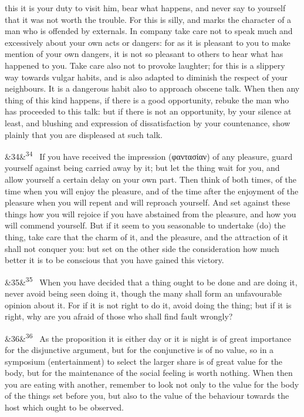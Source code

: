 \documentclass[12pt]{article}
\newcommand{\para}[1][]{\par\noindent\ifx&#1&\else\textsuperscript{\footnotesize #1}~\fi}
\begin{document}
this it is your duty to visit him, bear what happens, and never say to yourself that it was not worth the trouble. For this is silly, and marks the character of a man who is offended by externals. In company take care not to speak much and excessively about your own acts or dangers: for as it is pleasant to you to make mention of your own dangers, it is not so pleasant to others to hear what has happened to you. Take care also not to provoke laughter; for this is a slippery way towards vulgar habits, and is also adapted to diminish the respect of your neighbours. It is a dangerous habit also to approach obscene talk. When then any thing of this kind happens, if there is a good opportunity, rebuke the man who has proceeded to this talk: but if there is not an opportunity, by your silence at least, and blushing and expression of dissatisfaction by your countenance, show plainly that you are displeased at such talk.

\para[34] If you have received the impression (φαντασίαν) of any pleasure, guard yourself against being carried away by it; but let the thing wait for you, and allow yourself a certain delay on your own part. Then think of both times, of the time when you will enjoy the pleasure, and of the time after the enjoyment of the pleasure when you will repent and will reproach yourself. And set against these things how you will rejoice if you have abstained from the pleasure, and how you will commend yourself. But if it seem to you seasonable to undertake (do) the thing, take care that the charm of it, and the pleasure, and the attraction of it shall not conquer you: but set on the other side the consideration how much better it is to be conscious that you have gained this victory.

\para[35] When you have decided that a thing ought to be done and are doing it, never avoid being seen doing it, though the many shall form an unfavourable opinion about it. For if it is not right to do it, avoid doing the thing; but if it is right, why are you afraid of those who shall find fault wrongly?

\para[36] As the proposition it is either day or it is night is of great importance for the disjunctive argument, but for the conjunctive is of no value, so in a symposium (entertainment) to select the larger share is of great value for the body, but for the maintenance of the social feeling is worth nothing. When then you are eating with another, remember to look not only to the value for the body of the things set before you, but also to the value of the behaviour towards the host which ought to be observed.
\end{document}
